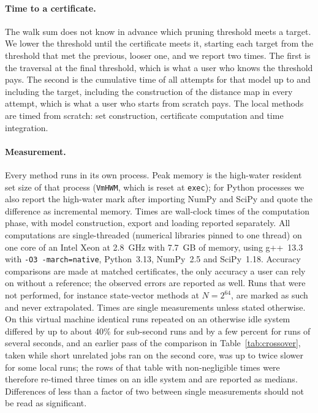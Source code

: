 \documentclass[aps,pra,superscriptaddress,floatfix,longbibliography,twocolumn]{revtex4-2}
\begin{document}
\paragraph*{Time to a certificate.} The walk sum does not know in advance which pruning threshold meets a target. We lower the threshold until the certificate meets it, starting each target from the threshold that met the previous, looser one, and we report two times. The first is the traversal at the final threshold, which is what a user who knows the threshold pays. The second is the cumulative time of all attempts for that model up to and including the target, including the construction of the distance map in every attempt, which is what a user who starts from scratch pays. The local methods are timed from scratch: set construction, certificate computation and time integration.

\paragraph*{Measurement.} Every method runs in its own process. Peak memory is the high-water resident set size of that process (\texttt{VmHWM}, which is reset at \texttt{exec}); for Python processes we also report the high-water mark after importing NumPy and SciPy and quote the difference as incremental memory. Times are wall-clock times of the computation phase, with model construction, export and loading reported separately. All computations are single-threaded (numerical libraries pinned to one thread) on one core of an Intel Xeon at 2.8~GHz with 7.7~GB of memory, using g++~13.3 with \texttt{-O3 -march=native}, Python~3.13, NumPy~2.5 and SciPy~1.18. Accuracy comparisons are made at matched certificates, the only accuracy a user can rely on without a reference; the observed errors are reported as well. Runs that were not performed, for instance state-vector methods at $N=2^{64}$, are marked as such and never extrapolated. Times are single measurements unless stated otherwise. On this virtual machine identical runs repeated on an otherwise idle system differed by up to about 40\% for sub-second runs and by a few percent for runs of several seconds, and an earlier pass of the comparison in Table~\ref{tab:crossover}, taken while short unrelated jobs ran on the second core, was up to twice slower for some local runs; the rows of that table with non-negligible times were therefore re-timed three times on an idle system and are reported as medians. Differences of less than a factor of two between single measurements should not be read as significant.
\end{document}
